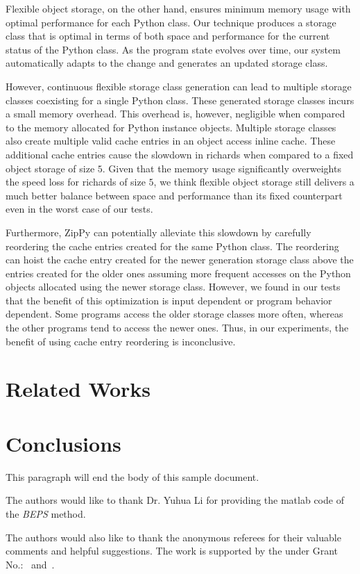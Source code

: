 Flexible object storage, on the other hand, ensures minimum memory usage with optimal performance for each Python class.
Our technique produces a storage class that is optimal in terms of both space and performance for the current status of the Python class.
As the program state evolves over time, our system automatically adapts to the change and generates an updated storage class.

However, continuous flexible storage class generation can lead to multiple storage classes coexisting for a single Python class.
These generated storage classes incurs a small memory overhead.
This overhead is, however, negligible when compared to the memory allocated for Python instance objects.
Multiple storage classes also create multiple valid cache entries in an object access inline cache.
These additional cache entries cause the slowdown in \textsf{richards} when compared to a fixed object storage of size $5$.
Given that the memory usage significantly overweights the speed loss for \textsf{richards} of size $5$, we think flexible object storage still delivers a much better balance between space and performance than its fixed counterpart even in the worst case of our tests.

Furthermore, ZipPy can potentially alleviate this slowdown by carefully reordering the cache entries created for the same Python class.
The reordering can hoist the cache entry created for the newer generation storage class above the entries created for the older ones assuming more frequent accesses on the Python objects allocated using the newer storage class.
However, we found in our tests that the benefit of this optimization is input dependent or program behavior dependent.
Some programs access the older storage classes more often, whereas the other programs tend to access the newer ones.
Thus, in our experiments, the benefit of using cache entry reordering is inconclusive.

\section{Related Works}
\label{sec:related-works}

\section{Conclusions}
This paragraph will end the body of this sample document.


\begin{acks}
  The authors would like to thank Dr. Yuhua Li for providing the
  matlab code of  the \textit{BEPS} method. 

  The authors would also like to thank the anonymous referees for
  their valuable comments and helpful suggestions. The work is
  supported by the  under Grant
  No.:~
  and~.

\end{acks}
